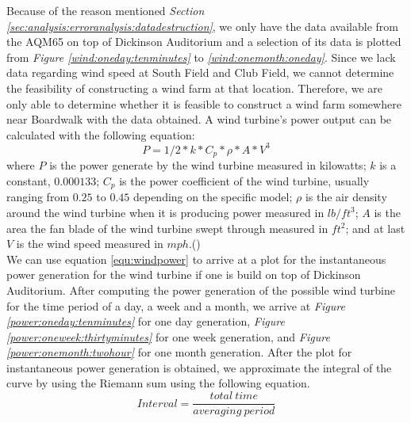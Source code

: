 \documentclass[review]{elsarticle}
\begin{document}
Because of the reason mentioned \textit{Section \ref{sec:analysis:erroranalysis:datadestruction}}, we only have the data available from the 
AQM65 on top of Dickinson Auditorium and a selection of its data is plotted from \textit{Figure \ref{wind:oneday:tenminutes}} to \textit{\ref{wind:onemonth:oneday}}. 
Since we lack data regarding wind speed at South Field and Club Field, we cannot determine the feasibility of constructing a wind farm at 
that location. Therefore, we are only able to determine whether it is feasible to construct a wind farm somewhere near Boardwalk with the 
data obtained. A wind turbine's power output can be calculated with the following equation:
\begin{equation}
    \label{equ:windpower}
    P=1/2*k*C_{p}*\rho*A*V^3
\end{equation}
where $P$ is the power generate by the wind turbine measured in kilowatts; $k$ is a constant, $0.000133$; $C_{p}$ is the power coefficient 
of the wind turbine, usually ranging from $0.25$ to $0.45$ depending on the specific model; $\rho$ is the air density around the wind turbine 
when it is producing power measured in $lb/ft^3$; $A$ is the area the fan blade of the wind turbine swept through measured in $ft^2$; and at 
last $V$ is the wind speed measured in $mph$.(\cite{capability_of_wind_power_accomodation_in_regional_power_grids})
\\\indent We can use equation \ref{equ:windpower} to arrive at a plot for the instantaneous power generation for the wind turbine if one is 
build on top of Dickinson Auditorium. After computing the power generation of the possible wind turbine for the time period of a day, a week 
and a month, we arrive at \textit{Figure \ref{power:oneday:tenminutes}} for one day generation, \textit{Figure \ref{power:oneweek:thirtyminutes}} 
for one week generation, and \textit{Figure \ref{power:onemonth:twohour}} for one month generation. After the plot for instantaneous power 
generation is obtained, we approximate the integral of the curve by using the Riemann sum using the following equation.
\begin{equation}
    \label{equ:windinterval}
    Interval = \frac{total\ time}{averaging\ period}
\end{equation}
\end{document}
